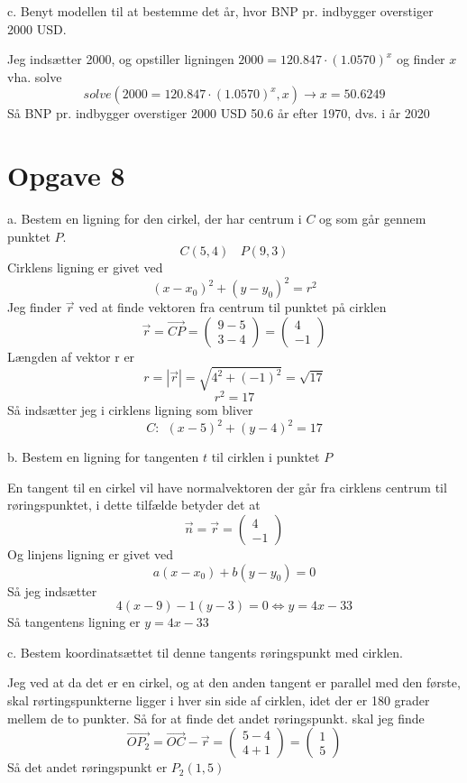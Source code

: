 \documentclass[12pt]{article}
\begin{document}
c. Benyt modellen til at bestemme det år, hvor BNP pr. indbygger overstiger 2000 USD.

Jeg indsætter 2000, og opstiller ligningen $2000 = 120.847\cdot(1.0570)^x$ og finder $x$ vha. solve
$$solve(2000 = 120.847\cdot(1.0570)^x,x) \rightarrow x = 50.6249$$
Så BNP pr. indbygger overstiger 2000 USD 50.6 år efter 1970, dvs. i år 2020

\section*{Opgave 8}

a. Bestem en ligning for den cirkel, der har centrum i $C$ og som går gennem punktet $P$.
$$C(5, 4)~~~~P(9, 3)$$
Cirklens ligning er givet ved
$$(x-x_0 )^2+(y-y_0 )^2 = r^2$$
Jeg finder $\vec{r}$ ved at finde vektoren fra centrum til punktet på cirklen
$$\vec{r} = \vec{CP} = \begin{pmatrix} 9-5 \\ 3-4 \end{pmatrix} = \begin{pmatrix} 4 \\ -1 \end{pmatrix}$$
Længden af vektor r er
$$r = |\vec{r}| = \sqrt{4^2+(-1)^2} = \sqrt{17}$$
$$r^2 = 17$$
Så indsætter jeg i cirklens ligning som bliver
$$C:~~(x-5)^2+(y-4)^2=17$$

b. Bestem en ligning for tangenten $t$ til cirklen i punktet $P$

En tangent til en cirkel vil have normalvektoren der går fra cirklens centrum til røringspunktet, i dette tilfælde betyder det at
$$\vec{n} = \vec{r} = \begin{pmatrix} 4 \\ -1 \end{pmatrix}$$
Og linjens ligning er givet ved
$$a(x-x_0)+b(y-y_0) = 0$$
Så jeg indsætter
$$4(x-9)-1(y-3) = 0 \Leftrightarrow y=4x-33$$
Så tangentens ligning er $y=4x-33$

c. Bestem koordinatsættet til denne tangents røringspunkt med cirklen.

Jeg ved at da det er en cirkel, og at den anden tangent er parallel med den første, skal rørtingspunkterne ligger i hver
sin side af cirklen, idet der er 180 grader mellem de to punkter. Så for at finde det andet røringspunkt. skal jeg finde
$$\vec{OP_2} = \vec{OC}-\vec{r} = \begin{pmatrix} 5-4 \\ 4+1 \end{pmatrix} = \begin{pmatrix} 1 \\ 5 \end{pmatrix}$$
Så det andet røringspunkt er $P_2(1, 5)$
\end{document}
